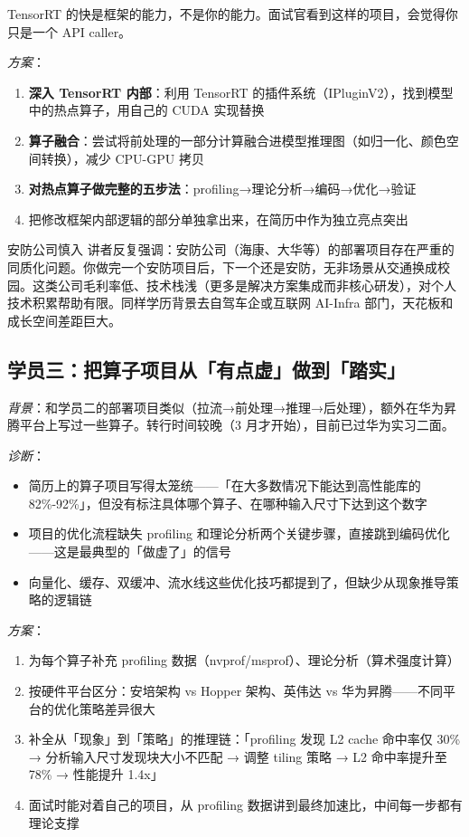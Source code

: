 \documentclass[a4paper]{article}
\begin{document}
TensorRT 的快是框架的能力，不是你的能力。面试官看到这样的项目，会觉得你只是一个 API caller。

\emph{方案}：
\begin{enumerate}
    \item \textbf{深入 TensorRT 内部}：利用 TensorRT 的插件系统（IPluginV2），找到模型中的热点算子，用自己的 CUDA 实现替换
    \item \textbf{算子融合}：尝试将前处理的一部分计算融合进模型推理图（如归一化、颜色空间转换），减少 CPU-GPU 拷贝
    \item \textbf{对热点算子做完整的五步法}：profiling→理论分析→编码→优化→验证
    \item 把修改框架内部逻辑的部分单独拿出来，在简历中作为独立亮点突出
\end{enumerate}

\begin{warningbox}{安防公司慎入}
讲者反复强调：安防公司（海康、大华等）的部署项目存在严重的同质化问题。你做完一个安防项目后，下一个还是安防，无非场景从交通换成校园。这类公司毛利率低、技术栈浅（更多是解决方案集成而非核心研发），对个人技术积累帮助有限。同样学历背景去自驾车企或互联网 AI-Infra 部门，天花板和成长空间差距巨大。
\end{warningbox}

\subsection{学员三：把算子项目从「有点虚」做到「踏实」}

\emph{背景}：和学员二的部署项目类似（拉流→前处理→推理→后处理），额外在华为昇腾平台上写过一些算子。转行时间较晚（3 月才开始），目前已过华为实习二面。

\emph{诊断}：
\begin{itemize}
    \item 简历上的算子项目写得太笼统——「在大多数情况下能达到高性能库的 82\%-92\%」，但没有标注具体哪个算子、在哪种输入尺寸下达到这个数字
    \item 项目的优化流程缺失 profiling 和理论分析两个关键步骤，直接跳到编码优化——这是最典型的「做虚了」的信号
    \item 向量化、缓存、双缓冲、流水线这些优化技巧都提到了，但缺少从现象推导策略的逻辑链
\end{itemize}

\emph{方案}：
\begin{enumerate}
    \item 为每个算子补充 profiling 数据（nvprof/msprof）、理论分析（算术强度计算）
    \item 按硬件平台区分：安培架构 vs Hopper 架构、英伟达 vs 华为昇腾——不同平台的优化策略差异很大
    \item 补全从「现象」到「策略」的推理链：「profiling 发现 L2 cache 命中率仅 30\% → 分析输入尺寸发现块大小不匹配 → 调整 tiling 策略 → L2 命中率提升至 78\% → 性能提升 1.4x」
    \item 面试时能对着自己的项目，从 profiling 数据讲到最终加速比，中间每一步都有理论支撑
\end{enumerate}
\end{document}
